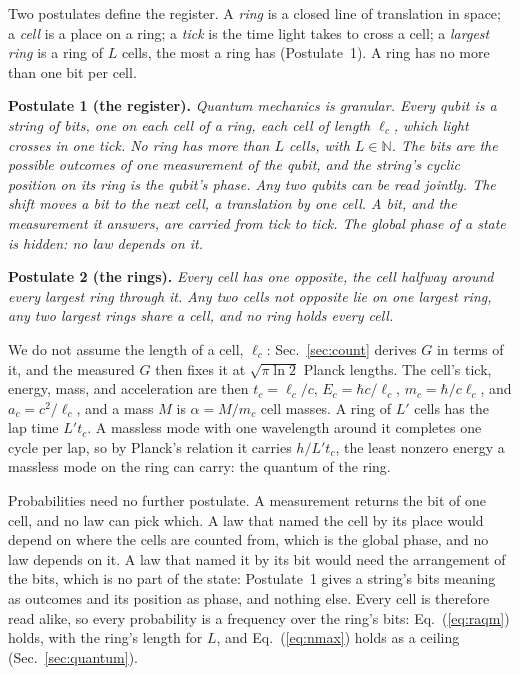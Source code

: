 \documentclass[aps,prd,twocolumn,superscriptaddress,nofootinbib,showkeys]{revtex4-2}
\makeatletter
\newcommand{\lc}{\ell_c}
\newcommand{\tc}{t_c}
\newcommand{\mc}{m_c}
\newcommand{\Ec}{E_c}
\newcommand{\ac}{a_c}
\def\section{\@startsection{section}{1}{\z@}{0.6cm \@plus1ex \@minus .2ex}{0.35cm}{\normalfont\small\bfseries}}
\makeatother
\begin{document}
\section{Postulates and Count}
\label{sec:postulates}

Two postulates define the register. A \emph{ring} is a closed line of translation in space; a \emph{cell} is a place on a ring; a \emph{tick} is the time light takes to cross a cell; a \emph{largest ring} is a ring of $L$ cells, the most a ring has (Postulate~1). A ring has no more than one bit per cell.

\textbf{Postulate 1 (the register).} \emph{Quantum mechanics is granular. Every qubit is a string of bits, one on each cell of a ring, each cell of length $\lc$, which light crosses in one tick. No ring has more than $L$ cells, with $L\in\mathbb{N}$. The bits are the possible outcomes of one measurement of the qubit, and the string's cyclic position on its ring is the qubit's phase. Any two qubits can be read jointly. The shift moves a bit to the next cell, a translation by one cell. A bit, and the measurement it answers, are carried from tick to tick. The global phase of a state is hidden: no law depends on it.}

\textbf{Postulate 2 (the rings).} \emph{Every cell has one opposite, the cell halfway around every largest ring through it. Any two cells not opposite lie on one largest ring, any two largest rings share a cell, and no ring holds every cell.}

We do not assume the length of a cell, $\lc$: Sec.~\ref{sec:count} derives $G$ in terms of it, and the measured $G$ then fixes it at $\sqrt{\pi\ln2}$ Planck lengths. The cell's tick, energy, mass, and acceleration are then $\tc = \lc/c$, $\Ec = \hbar c/\lc$, $\mc = \hbar/c\lc$, and $\ac = c^2/\lc$, and a mass $M$ is $\alpha = M/\mc$ cell masses. A ring of $L'$ cells has the lap time $L'\tc$. A massless mode with one wavelength around it completes one cycle per lap, so by Planck's relation it carries $h/L'\tc$, the least nonzero energy a massless mode on the ring can carry: the quantum of the ring.

Probabilities need no further postulate. A measurement returns the bit of one cell, and no law can pick which. A law that named the cell by its place would depend on where the cells are counted from, which is the global phase, and no law depends on it. A law that named it by its bit would need the arrangement of the bits, which is no part of the state: Postulate~1 gives a string's bits meaning as outcomes and its position as phase, and nothing else. Every cell is therefore read alike, so every probability is a frequency over the ring's bits: Eq.~(\ref{eq:raqm}) holds, with the ring's length for $L$, and Eq.~(\ref{eq:nmax}) holds as a ceiling (Sec.~\ref{sec:quantum}).
\end{document}
